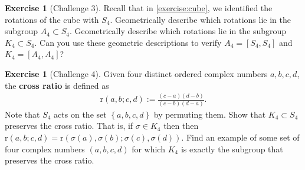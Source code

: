 \documentclass[reqno, 12pt, letter]{article}
\theoremstyle{plain}
\theoremstyle{definition}
\newtheorem{exercise}[theorem]{Exercise}
\theoremstyle{remark}
\numberwithin{equation}{section}
\begin{document}
\begin{exercise}[Challenge 3]
	\label{exercise:}
	Recall that in \autoref{exercise:cube}, we identified the rotations of the cube with $S_4$.
	Geometrically describe which rotations lie in the subgroup $A_4 \subset S_4$.
	Geometrically describe which rotations lie in the subgroup $K_4 \subset S_4$.
	Can you use these geometric descriptions to verify $A_4 = \left[ S_4, S_4 \right]$ and $K_4 = \left[ A_4, A_4 \right]$?
\end{exercise}
\begin{exercise}[Challenge 4]
	\label{exercise:}
	Given four distinct ordered complex numbers $a,b,c,d$, the {\bf cross ratio} is defined as
	\begin{align*}
		\mathrm{r}(a,b;c,d) := \frac{(c-a)(d-b)}{(c-b)(d-a)}.
	\end{align*}
Note that $S_4$ acts on the set $\left\{ a,b,c,d \right\}$ by permuting them. Show that $K_4 \subset S_4$ preserves the cross ratio.
	That is, if $\sigma \in K_4$ then then $\mathrm{r}(a,b;c,d) = \mathrm{r}(\sigma(a),\sigma(b);\sigma(c),\sigma(d))$.
	Find an example of some set of four complex numbers $(a,b,c,d)$ for which $K_4$ is exactly the subgroup that preserves
	the cross ratio.
\end{exercise}
\end{document}
